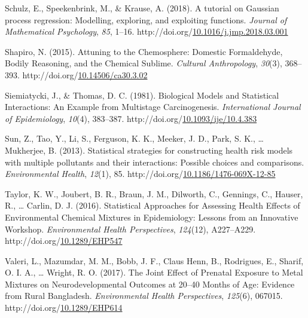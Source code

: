 \documentclass[12pt, twoside]{amherstthesis}
\newenvironment{CSLReferences}[2]%
  {}%
  {\par}
\begin{document}
\begin{CSLReferences}{1}{0}
\leavevmode{}%
Schulz, E., Speekenbrink, M., \& Krause, A. (2018). A tutorial on {Gaussian} process regression: {Modelling}, exploring, and exploiting functions. \emph{Journal of Mathematical Psychology}, \emph{85}, 1--16. http://doi.org/\href{https://doi.org/10.1016/j.jmp.2018.03.001}{10.1016/j.jmp.2018.03.001}

\leavevmode{}%
Shapiro, N. (2015). Attuning to the {Chemosphere}: {Domestic} {Formaldehyde}, {Bodily} {Reasoning}, and the {Chemical} {Sublime}. \emph{Cultural Anthropology}, \emph{30}(3), 368--393. http://doi.org/\href{https://doi.org/10.14506/ca30.3.02}{10.14506/ca30.3.02}

\leavevmode{}%
Siemiatycki, J., \& Thomas, D. C. (1981). Biological {Models} and {Statistical} {Interactions}: An {Example} from {Multistage} {Carcinogenesis}. \emph{International Journal of Epidemiology}, \emph{10}(4), 383--387. http://doi.org/\href{https://doi.org/10.1093/ije/10.4.383}{10.1093/ije/10.4.383}

\leavevmode{}%
Sun, Z., Tao, Y., Li, S., Ferguson, K. K., Meeker, J. D., Park, S. K., \ldots{} Mukherjee, B. (2013). Statistical strategies for constructing health risk models with multiple pollutants and their interactions: Possible choices and comparisons. \emph{Environmental Health}, \emph{12}(1), 85. http://doi.org/\href{https://doi.org/10.1186/1476-069X-12-85}{10.1186/1476-069X-12-85}

\leavevmode{}%
Taylor, K. W., Joubert, B. R., Braun, J. M., Dilworth, C., Gennings, C., Hauser, R., \ldots{} Carlin, D. J. (2016). Statistical {Approaches} for {Assessing} {Health} {Effects} of {Environmental} {Chemical} {Mixtures} in {Epidemiology}: {Lessons} from an {Innovative} {Workshop}. \emph{Environmental Health Perspectives}, \emph{124}(12), A227--A229. http://doi.org/\href{https://doi.org/10.1289/EHP547}{10.1289/EHP547}

\leavevmode{}%
Valeri, L., Mazumdar, M. M., Bobb, J. F., Claus Henn, B., Rodrigues, E., Sharif, O. I. A., \ldots{} Wright, R. O. (2017). The {Joint} {Effect} of {Prenatal} {Exposure} to {Metal} {Mixtures} on {Neurodevelopmental} {Outcomes} at 20--40 {Months} of {Age}: {Evidence} from {Rural} {Bangladesh}. \emph{Environmental Health Perspectives}, \emph{125}(6), 067015. http://doi.org/\href{https://doi.org/10.1289/EHP614}{10.1289/EHP614}


\end{CSLReferences}
\end{document}

